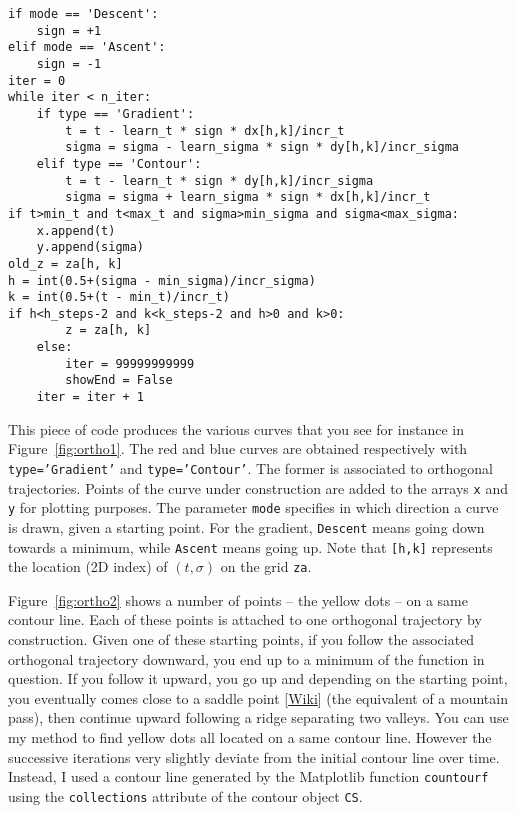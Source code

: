 \documentclass[oneside,10pt]{book}
\begin{document}
\begin{lstlisting}
if mode == 'Descent': 
    sign = +1
elif mode == 'Ascent':
    sign = -1
iter = 0
while iter < n_iter:
    if type == 'Gradient':
        t = t - learn_t * sign * dx[h,k]/incr_t
        sigma = sigma - learn_sigma * sign * dy[h,k]/incr_sigma    
    elif type == 'Contour':
        t = t - learn_t * sign * dy[h,k]/incr_sigma  
        sigma = sigma + learn_sigma * sign * dx[h,k]/incr_t   
if t>min_t and t<max_t and sigma>min_sigma and sigma<max_sigma: 
    x.append(t)
    y.append(sigma)
old_z = za[h, k]
h = int(0.5+(sigma - min_sigma)/incr_sigma)
k = int(0.5+(t - min_t)/incr_t)             
if h<h_steps-2 and k<k_steps-2 and h>0 and k>0: 
        z = za[h, k]
    else:
        iter = 99999999999
        showEnd = False
    iter = iter + 1
\end{lstlisting}\vspace{1ex}

This piece of code produces the various curves that you see for instance in Figure~\ref{fig:ortho1}. The red and blue curves are obtained respectively
 with \texttt{type='Gradient'} and \texttt{type='Contour'}. The former is associated to orthogonal trajectories. Points of the curve under construction are added to the arrays \texttt{x} and \texttt{y}  for plotting purposes. The parameter \texttt{mode} specifies in which direction a curve is drawn, given a starting point. For the gradient, \texttt{Descent} means going down towards a minimum, while \texttt{Ascent} means going up. Note that \texttt{[h,k]} represents the location (2D index) of $(t,\sigma)$ on the grid \texttt{za}. 


Figure~\ref{fig:ortho2} shows a number of points -- the yellow dots -- on a same contour line. Each of these points is attached to one orthogonal trajectory by construction. Given one of these starting points, if you follow the associated orthogonal trajectory downward, you end up to a minimum of the function in
 question. If you follow it upward, you go up and depending on the starting point, you eventually comes close to a 
\textcolor{index}{saddle point} [\href{https://en.wikipedia.org/wiki/Saddle_point}{Wiki}] (the equivalent of a mountain pass), then continue upward following a ridge separating two valleys. You can use my method to find yellow dots all located on a same contour line. However the successive iterations very slightly deviate from the initial contour line over time. Instead, I used a contour line generated by the Matplotlib function \texttt{countourf} using the 
\texttt{collections} attribute of the contour object \texttt{CS}. 
\end{document}
